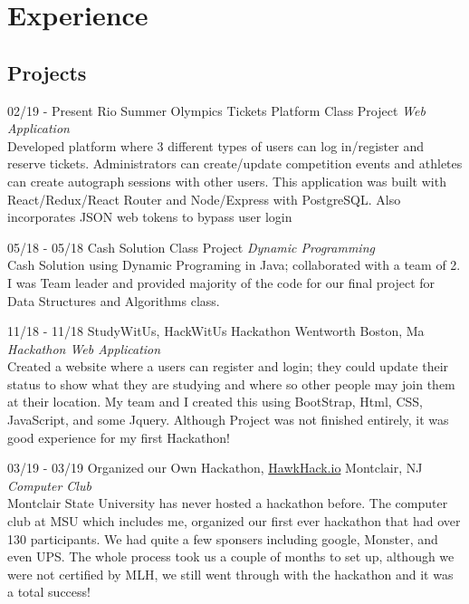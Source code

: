\documentclass[]{friggeri-cv}
\begin{document}
\section{Experience}

\subsection{Projects}

\begin{entrylist}


\entry
{02/19 - Present }
{ Rio Summer Olympics Tickets Platform}
{Class Project}
{\emph{Web Application} \\
Developed platform where 3 different types of users can log in/register and reserve tickets. Administrators can create/update competition events and athletes can create autograph sessions with other users. This application was built with React/Redux/React Router and Node/Express with PostgreSQL. Also incorporates JSON web tokens to bypass user login  }

\entry
{05/18 - 05/18}
{Cash Solution}
{Class Project}
{\emph{Dynamic Programming} \\
Cash Solution using Dynamic Programing in Java; collaborated with a team of 2. I was Team leader and provided majority of the code for our final project for Data Structures and Algorithms class.}

\entry
{11/18 - 11/18}
{StudyWitUs, HackWitUs Hackathon}
{Wentworth Boston, Ma}
{\emph{Hackathon Web Application} \\
Created a website where a users can register and login; they could update their status to show what they are studying and where so other people may join them at their location. My team and I created this using BootStrap, Html, CSS, JavaScript, and some Jquery. Although Project was not finished entirely, it was good experience for my first Hackathon! }

\entry
{03/19 - 03/19}
{Organized our Own Hackathon, \href {http://hawkhack.io}{HawkHack.io}}
{Montclair, NJ}
{\emph{Computer Club} \\
Montclair State University has never hosted a hackathon before. The computer club at MSU which includes me, organized our first ever hackathon that had over 130 participants. We had quite a few sponsers including google, Monster, and even UPS. The whole process took us a couple of months to set up, although we were not certified by MLH, we still went through with the hackathon and it was a total success!}

\end{entrylist}
\end{document}
